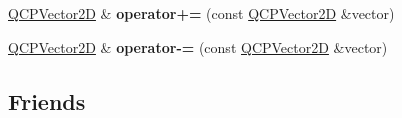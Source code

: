 \begin{DoxyCompactItemize}
\item 
\hyperlink{class_q_c_p_vector2_d}{Q\+C\+P\+Vector2D} \& {\bfseries operator+=} (const \hyperlink{class_q_c_p_vector2_d}{Q\+C\+P\+Vector2D} \&vector)\hypertarget{class_q_c_p_vector2_d_a40549cdc8ecace36c241e949a6d8c1dc}{}\label{class_q_c_p_vector2_d_a40549cdc8ecace36c241e949a6d8c1dc}

\item 
\hyperlink{class_q_c_p_vector2_d}{Q\+C\+P\+Vector2D} \& {\bfseries operator-\/=} (const \hyperlink{class_q_c_p_vector2_d}{Q\+C\+P\+Vector2D} \&vector)\hypertarget{class_q_c_p_vector2_d_a96e47599c085a1e7cee8088e0f7cae35}{}\label{class_q_c_p_vector2_d_a96e47599c085a1e7cee8088e0f7cae35}

\end{DoxyCompactItemize}
\subsection*{Friends}
